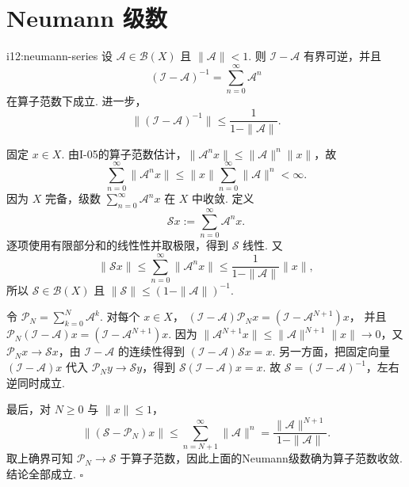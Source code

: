 \section{Neumann 级数}\label{sec:i12-neumann}

\begin{FALemma}[B][Neumann级数]{i12:neumann-series}
设 \(\displaystyle \mathcal A\in\mathcal B(X)\) 且 \(\displaystyle \|\mathcal A\|<1\). 则 \(\displaystyle \mathcal I-\mathcal A\) 有界可逆，并且
\[
(\mathcal I-\mathcal A)^{-1}
=
\sum_{n=0}^{\infty}\mathcal A^n
\]
在算子范数下成立. 进一步，
\[
\|(\mathcal I-\mathcal A)^{-1}\|
\leqslant
\frac{1}{1-\|\mathcal A\|}.
\]
\end{FALemma}

\begin{FAProof}
固定 \(\displaystyle x\in X\). 由I-05的算子范数估计，\(\displaystyle \|\mathcal A^n x\|\leqslant\|\mathcal A\|^n\|x\|\)，故
\[
\sum_{n=0}^{\infty}\|\mathcal A^n x\|
\leqslant
\|x\|\sum_{n=0}^{\infty}\|\mathcal A\|^n
<\infty.
\]
因为 \(\displaystyle X\) 完备，级数 \(\displaystyle \sum_{n=0}^{\infty}\mathcal A^n x\) 在 \(\displaystyle X\) 中收敛. 定义
\[
\mathcal Sx
:=
\sum_{n=0}^{\infty}\mathcal A^n x.
\]
逐项使用有限部分和的线性性并取极限，得到 \(\displaystyle \mathcal S\) 线性. 又
\[
\|\mathcal Sx\|
\leqslant
\sum_{n=0}^{\infty}\|\mathcal A^n x\|
\leqslant
\frac{1}{1-\|\mathcal A\|}\|x\|,
\]
所以 \(\displaystyle \mathcal S\in\mathcal B(X)\) 且 \(\displaystyle \|\mathcal S\|\leqslant(1-\|\mathcal A\|)^{-1}\).

令 \(\displaystyle \mathcal P_N=\sum_{k=0}^{N}\mathcal A^k\). 对每个 \(\displaystyle x\in X\)，
\(\displaystyle (\mathcal I-\mathcal A)\mathcal P_Nx = (\mathcal I-\mathcal A^{N+1})x\)，
并且
\(\displaystyle \mathcal P_N(\mathcal I-\mathcal A)x = (\mathcal I-\mathcal A^{N+1})x\).
因为 \(\displaystyle \|\mathcal A^{N+1}x\|\leqslant\|\mathcal A\|^{N+1}\|x\|\to0\)，又 \(\displaystyle \mathcal P_Nx\to\mathcal Sx\)，由 \(\displaystyle \mathcal I-\mathcal A\) 的连续性得到
\(\displaystyle (\mathcal I-\mathcal A)\mathcal Sx=x\).
另一方面，把固定向量 \(\displaystyle (\mathcal I-\mathcal A)x\) 代入 \(\displaystyle \mathcal P_Ny\to\mathcal Sy\)，得到
\(\displaystyle \mathcal S(\mathcal I-\mathcal A)x=x\).
故 \(\displaystyle \mathcal S=(\mathcal I-\mathcal A)^{-1}\)，左右逆同时成立.

最后，对 \(\displaystyle N\geqslant0\) 与 \(\displaystyle \|x\|\leqslant1\)，
\[
\|(\mathcal S-\mathcal P_N)x\|
\leqslant
\sum_{n=N+1}^{\infty}\|\mathcal A\|^n
=
\frac{\|\mathcal A\|^{N+1}}{1-\|\mathcal A\|}.
\]
取上确界可知 \(\displaystyle \mathcal P_N\to\mathcal S\) 于算子范数，因此上面的Neumann级数确为算子范数收敛.
结论全部成立.
\hfill\(\square\)
\end{FAProof}

